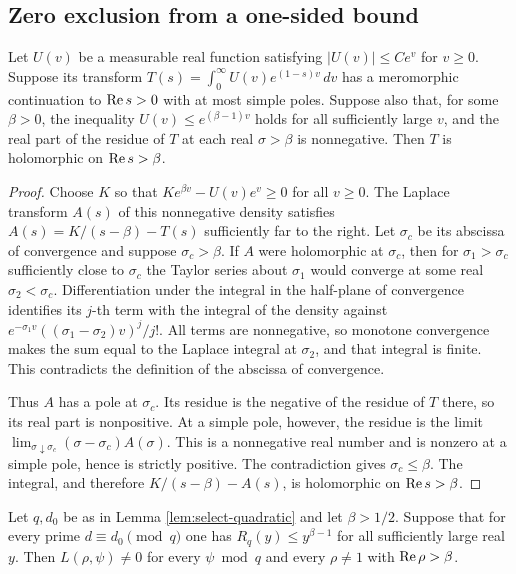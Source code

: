\subsection{Zero exclusion from a one-sided bound}

\begin{lemma}\label{lem:landau}
Let \(U(v)\) be a measurable real function satisfying \(|U(v)|\le C e^v\)
for \(v\ge0\). Suppose its transform \(T(s)=\int_0^\infty U(v)e^{(1-s)v}\,dv\)
has a meromorphic continuation to \(\operatorname{Re} s>0\) with at most simple poles.
Suppose also that, for some \(\beta>0\), the inequality \(U(v)\le e^{(\beta-1)v}\)
holds for all sufficiently large \(v\), and the real part of the residue of
\(T\) at each real \(\sigma>\beta\) is nonnegative. Then \(T\) is holomorphic
on \(\operatorname{Re} s>\beta\).
\end{lemma}

\begin{proof}
Choose \(K\) so that \(K e^{\beta v}-U(v)e^v\ge0\) for all \(v\ge0\).
The Laplace transform \(A(s)\) of this nonnegative density satisfies
\(A(s)=K/(s-\beta)-T(s)\) sufficiently far to the right.
Let \(\sigma_c\) be its abscissa of convergence and suppose \(\sigma_c>\beta\).
If \(A\) were holomorphic at \(\sigma_c\), then for \(\sigma_1>\sigma_c\)
sufficiently close to \(\sigma_c\) the Taylor series about \(\sigma_1\) would
converge at some real \(\sigma_2<\sigma_c\). Differentiation under the integral
in the half-plane of convergence identifies its \(j\)-th term with the integral
of the density against \(e^{-\sigma_1 v}((\sigma_1-\sigma_2)v)^j/j!\).
All terms are nonnegative, so monotone convergence makes the sum equal to the
Laplace integral at \(\sigma_2\), and that integral is finite. This contradicts
the definition of the abscissa of convergence.

Thus \(A\) has a pole at \(\sigma_c\). Its residue is the negative of the residue
of \(T\) there, so its real part is nonpositive. At a simple pole, however, the
residue is the limit
\(\lim_{\sigma\downarrow\sigma_c}(\sigma-\sigma_c)A(\sigma)\).
This is a nonnegative real number and is nonzero at a simple pole, hence is
strictly positive. The contradiction gives \(\sigma_c\le\beta\).
The integral, and therefore \(K/(s-\beta)-A(s)\), is holomorphic on
\(\operatorname{Re} s>\beta\).
\end{proof}

\begin{proposition}\label{prop:one-sided-criterion}
Let \(q,d_0\) be as in Lemma \ref{lem:select-quadratic} and let \(\beta>1/2\).
Suppose that for every prime \(d\equiv d_0\pmod q\) one has
\(R_q(y)\le y^{\beta-1}\) for all sufficiently large real \(y\).
Then \(L(\rho,\psi)\ne0\) for every \(\psi\bmod q\) and every \(\rho\ne1\)
with \(\operatorname{Re}\rho>\beta\).
\end{proposition}

